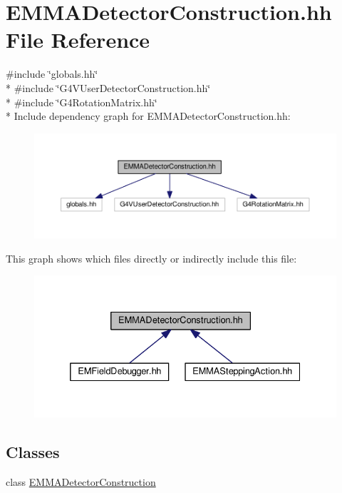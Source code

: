 \hypertarget{EMMADetectorConstruction_8hh}{}\section{E\+M\+M\+A\+Detector\+Construction.\+hh File Reference}
\label{EMMADetectorConstruction_8hh}
{\ttfamily \#include \char`\"{}globals.\+hh\char`\"{}}\\*
{\ttfamily \#include \char`\"{}G4\+V\+User\+Detector\+Construction.\+hh\char`\"{}}\\*
{\ttfamily \#include \char`\"{}G4\+Rotation\+Matrix.\+hh\char`\"{}}\\*
Include dependency graph for E\+M\+M\+A\+Detector\+Construction.\+hh\+:
\nopagebreak
\begin{figure}[H]
\begin{center}
\leavevmode
\includegraphics[width=350pt]{EMMADetectorConstruction_8hh__incl}
\end{center}
\end{figure}
This graph shows which files directly or indirectly include this file\+:
\nopagebreak
\begin{figure}[H]
\begin{center}
\leavevmode
\includegraphics[width=332pt]{EMMADetectorConstruction_8hh__dep__incl}
\end{center}
\end{figure}
\subsection*{Classes}
\begin{DoxyCompactItemize}
\item 
class \hyperlink{classEMMADetectorConstruction}{E\+M\+M\+A\+Detector\+Construction}
\end{DoxyCompactItemize}
